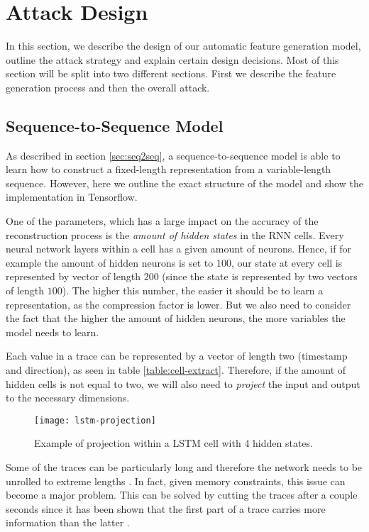 

\section{Attack Design}

In this section, we describe the design of our automatic feature generation model, outline the attack strategy and explain certain design decisions.
Most of this section will be split into two different sections.
First we describe the feature generation process and then the overall attack.

\subsection{Sequence-to-Sequence Model}

As described in section \ref{sec:seq2seq}, a sequence-to-sequence model is able to learn how to construct a fixed-length representation from a variable-length sequence.
However, here we outline the exact structure of the model and show the implementation in Tensorflow.

One of the parameters, which has a large impact on the accuracy of the reconstruction process is the \textit{amount of hidden states} in the RNN cells.
Every neural network layers within a cell has a given amount of neurons.
Hence, if for example the amount of hidden neurons is set to $100$, our state at every cell is represented by vector of length $200$ (since the state is represented by two vectors of length $100$).
The higher this number, the easier it should be to learn a representation, as the compression factor is lower.
But we also need to consider the fact that the higher the amount of hidden neurons, the more variables the model needs to learn.

Each value in a trace can be represented by a vector of length two (timestamp and direction), as seen in table \ref{table:cell-extract}.
Therefore, if the amount of hidden cells is not equal to two, we will also need to \textit{project} the input and output to the necessary dimensions.

\begin{figure}[ht]
  \centering
  \texttt{[image: lstm-projection]}
  \caption{Example of projection within a LSTM cell with 4 hidden states.}
  \label{fig:lstm-projection}
\end{figure}

Some of the traces can be particularly long and therefore the network needs to be unrolled to extreme lengths \cite{greschbach2016effect}.
In fact, given memory constraints, this issue can become a major problem.
This can be solved by cutting the traces after a couple seconds since it has been shown that the first part of a trace carries more information than the latter \cite{TODO: Include}.


